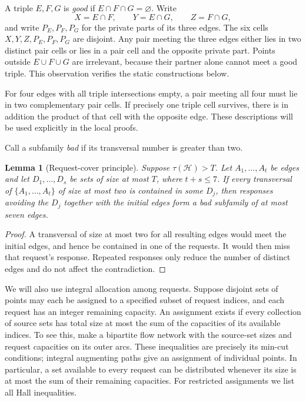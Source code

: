 \documentclass[11pt]{article}
\numberwithin{equation}{section}
\newtheorem{lemma}[theorem]{Lemma}
\theoremstyle{definition}
\theoremstyle{remark}
\newcommand{\HH}{\mathcal H}
\begin{document}
A triple $E,F,G$ is \emph{good} if $E\cap F\cap G=\varnothing$.
Write
\[
 X=E\cap F,\qquad Y=E\cap G,\qquad Z=F\cap G,
\]
and write $P_E,P_F,P_G$ for the private parts of its three edges.
The six cells $X,Y,Z,P_E,P_F,P_G$ are disjoint. Any pair meeting the
three edges either lies in two distinct pair cells or lies in a pair
cell and the opposite private part. Points outside $E\cup F\cup G$
are irrelevant, because their partner alone cannot meet a good triple.
This observation verifies the static constructions below.

For four edges with all triple intersections empty, a pair meeting all
four must lie in two complementary pair cells. If precisely one triple
cell survives, there is in addition the product of that cell with the
opposite edge. These descriptions will be used explicitly in the local
proofs.

Call a subfamily \emph{bad} if its transversal number is greater than
two.

\begin{lemma}[Request-cover principle]\label{lem:requestcover}
Suppose $\tau(\HH)>T$. Let $A_1,\ldots,A_t$ be edges and let
$D_1,\ldots,D_s$ be sets of size at most $T$, where $t+s\le7$.
If every transversal of $\{A_1,\ldots,A_t\}$ of size at most two is
contained in some $D_j$, then responses avoiding the $D_j$ together
with the initial edges form a bad subfamily of at most seven edges.
\end{lemma}
\begin{proof}
A transversal of size at most two for all resulting edges would meet
the initial edges, and hence be contained in one of the requests. It
would then miss that request's response. Repeated responses only reduce
the number of distinct edges and do not affect the contradiction.
\end{proof}

We will also use integral allocation among requests. Suppose disjoint
sets of points may each be assigned to a specified subset of request
indices, and each request has an integer remaining capacity. An
assignment exists if every collection of source sets has total size at
most the sum of the capacities of its available indices. To see this,
make a bipartite flow network with the source-set sizes and request
capacities on its outer arcs. These inequalities are precisely its
min-cut conditions; integral augmenting paths give an assignment of
individual points. In particular, a set available to every request can
be distributed whenever its size is at most the sum of their remaining
capacities. For restricted assignments we list all Hall inequalities.
\end{document}
